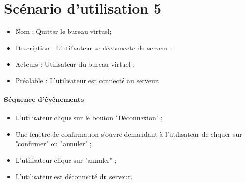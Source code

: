 \section{Scénario d'utilisation 5}
\begin{itemize}
	\item Nom : Quitter le bureau virtuel;
	\item Description : L'utilisateur se déconnecte du serveur ;
	\item Acteurs : Utilisateur du bureau virtuel ;
	\item Préalable : L'utilisateur est connecté  au serveur.
\end{itemize}

\paragraph{Séquence d'événements}
\begin{itemize}
	\item L'utilisateur clique sur le bouton "Déconnexion" ;
	\item Une fenêtre de confirmation s'ouvre demandant à l'utilisateur de cliquer sur "confirmer" ou "annuler" ;
	\item L'utilisateur clique sur "annuler" ;
	\item L'utilisateur est déconnecté du serveur.
\end{itemize}

